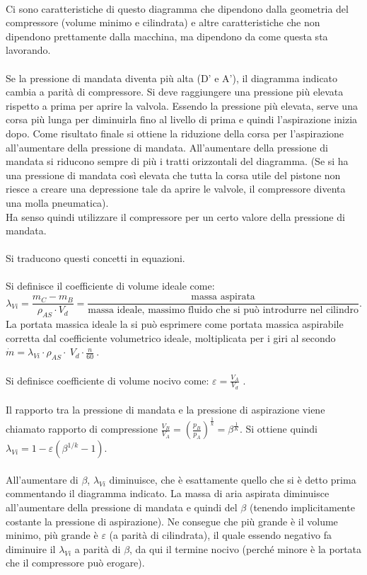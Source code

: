 \\
Ci sono caratteristiche di questo diagramma che dipendono dalla geometria del compressore (volume minimo e cilindrata) e altre caratteristiche che non dipendono prettamente dalla macchina, ma dipendono da come questa sta lavorando.\\
\\
Se la pressione di mandata diventa più alta (D’ e A’), il diagramma indicato cambia a parità di compressore. Si deve raggiungere una pressione più elevata rispetto a prima per aprire la valvola. Essendo la pressione più elevata, serve una corsa più lunga per diminuirla fino al livello di prima e quindi l’aspirazione inizia dopo. 
Come risultato finale si ottiene la riduzione della corsa per l’aspirazione all’aumentare della pressione di mandata. All’aumentare della pressione di mandata si riducono sempre di più i tratti orizzontali del diagramma. (Se si ha una pressione di mandata così elevata che tutta la corsa utile del pistone non riesce a creare una depressione tale da aprire le valvole, il compressore diventa una molla pneumatica). \\
Ha senso quindi utilizzare il compressore per un certo valore della pressione di mandata. \\
\\
Si traducono questi concetti in equazioni.\\
\\
Si definisce il coefficiente di volume ideale come:
\begin{equation}
 \lambda_{Vi}=\frac{m_C-m_B}{\rho_{AS}\cdot V_d}=\frac{\mbox{massa aspirata}}{\mbox{massa ideale, massimo fluido che si può introdurre nel cilindro}}.
\end{equation}
La portata massica ideale la si può esprimere come portata massica aspirabile corretta dal coefficiente volumetrico ideale, moltiplicata per i giri al secondo $\dot{m}=\lambda_{Vi}\cdot\rho_{AS}\cdot\ V_d\cdot\frac{n}{60}\ .$\\
\\
Si definisce coefficiente di volume nocivo come:  $\varepsilon=\frac{V_A}{V_d}$ .\\
\\
Il rapporto tra la pressione di mandata e la pressione di aspirazione viene chiamato rapporto di compressione $\frac{V_B}{V_A}=\left(\frac{p_B}{p_A}\right)^\frac{1}{k}=\beta^\frac{1}{K}$. Si ottiene quindi $\lambda_{Vi}=1-\varepsilon\left(\beta^{1/k}-1\right)$.\\
\\
All’aumentare di $\beta$, $\lambda_{Vi}$ diminuisce, che è esattamente quello che si è detto prima commentando il diagramma indicato. La massa di aria aspirata diminuisce all’aumentare della pressione di mandata e quindi del $\beta$ (tenendo implicitamente costante la pressione di aspirazione). Ne consegue che più grande è il volume minimo, più grande è $\varepsilon$ (a parità di cilindrata), il quale essendo negativo fa diminuire il $\lambda_{Vi}$ a parità di $\beta$, da qui il termine nocivo (perché minore è la portata che il compressore può erogare). \\
